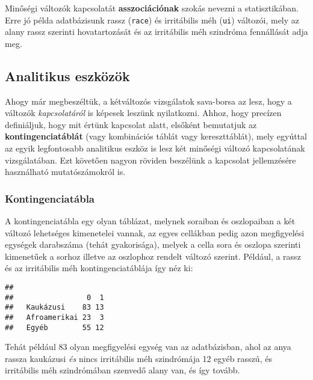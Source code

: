 \documentclass[]{book}
\newenvironment{Shaded}{\begin{snugshade}}{\end{snugshade}}
\newcommand{\KeywordTok}[1]{\textcolor[rgb]{0.13,0.29,0.53}{\textbf{#1}}}
\newcommand{\OperatorTok}[1]{\textcolor[rgb]{0.81,0.36,0.00}{\textbf{#1}}}
\newcommand{\NormalTok}[1]{#1}
\begin{document}
Minőségi változók kapcsolatát \textbf{asszociációnak} szokás nevezni a
statisztikában. Erre jó példa adatbázisunk rassz (\texttt{race}) és
irritábilis méh (\texttt{ui}) változói, mely az alany rassz szerinti
hovatartozását és az irritábilis méh szindróma fennállását adja meg.

\subsection{Analitikus eszközök}\label{deskriptivminketvaltanalitikus}

Ahogy már megbeszéltük, a kétváltozós vizsgálatok sava-borsa az lesz,
hogy a változók \emph{kapcsolatáról} is képesek leszünk nyilatkozni.
Ahhoz, hogy precízen definiáljuk, hogy mit értünk kapcsolat alatt,
elsőként bemutatjuk az \textbf{kontingenciatáblát} (vagy kombinációs
táblát vagy kereszttáblát), mely egyúttal az egyik legfontosabb
analitikus eszköz is lesz két minőségi változó kapcsolatának
vizsgálatában. Ezt követően nagyon röviden beszélünk a kapcsolat
jellemzésére használható mutatószámokról is.

\subsubsection{Kontingenciatábla}\label{deskriptivminketvaltanalitikuskontingenciatabla}

A kontingenciatábla egy olyan táblázat, melynek soraiban és oszlopaiban
a két változó lehetséges kimenetelei vannak, az egyes cellákban pedig
azon megfigyelési egységek darabszáma (tehát gyakorisága), melyek a
cella sora és oszlopa szerinti kimenetűek a sorhoz illetve az oszlophoz
rendelt változó szerint. Például, a rassz és az irritábilis méh
kontingenciatáblája így néz ki:

\begin{Shaded}
\end{Shaded}

\begin{verbatim}
##               
##                 0  1
##   Kaukázusi    83 13
##   Afroamerikai 23  3
##   Egyéb        55 12
\end{verbatim}

Tehát például 83 olyan megfigyelési egység van az adatbázisban, ahol az
anya rassza kaukázusi \emph{és} nincs irritábilis méh szindrómája 12
egyéb rasszú, és irritábilis méh szindrómában szenvedő alany van, és így
tovább.
\end{document}
